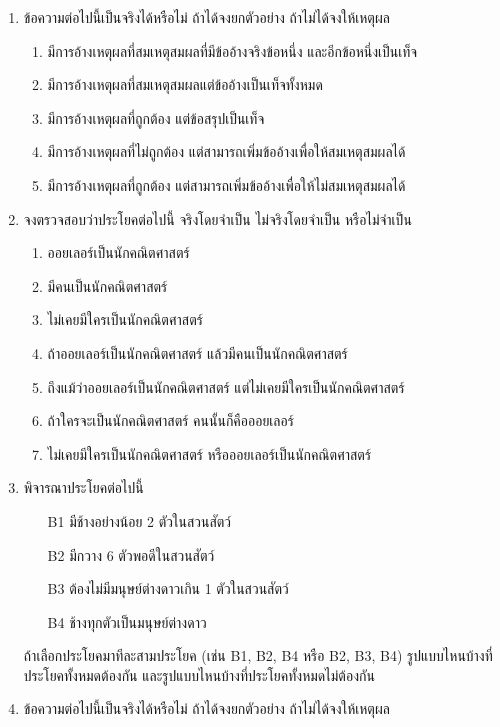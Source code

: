 \documentclass[a4paper,12pt]{extbook}
\theoremstyle{definition}
\theoremstyle{remark}
\begin{document}
\begin{enumerate}
\begin{enumerate}[label={(\arabic*)}]
\begin{enumerate}[label={\arabic*.}]
					\end{enumerate}
				\end{enumerate}
				\item ข้อความต่อไปนี้เป็นจริงได้หรือไม่ ถ้าได้จงยกตัวอย่าง ถ้าไม่ได้จงให้เหตุผล
				\begin{enumerate}[label={\arabic*.}]
					\item มีการอ้างเหตุผลที่สมเหตุสมผลที่มีข้ออ้างจริงข้อหนึ่ง และอีกข้อหนึ่งเป็นเท็จ
					\item มีการอ้างเหตุผลที่สมเหตุสมผลแต่ข้ออ้างเป็นเท็จทั้งหมด
					\item มีการอ้างเหตุผลที่ถูกต้อง แต่ข้อสรุปเป็นเท็จ
					\item มีการอ้างเหตุผลที่ไม่ถูกต้อง แต่สามารถเพิ่มข้ออ้างเพื่อให้สมเหตุสมผลได้
					\item มีการอ้างเหตุผลที่ถูกต้อง แต่สามารถเพิ่มข้ออ้างเพื่อให้ไม่สมเหตุสมผลได้
				\end{enumerate}
				\item จงตรวจสอบว่าประโยคต่อไปนี้ จริงโดยจำเป็น ไม่จริงโดยจำเป็น หรือไม่จำเป็น
				\begin{enumerate}[label={\arabic*.}]
					\item ออยเลอร์เป็นนักคณิตศาสตร์
					\item มีคนเป็นนักคณิตศาสตร์
					\item ไม่เคยมีใครเป็นนักคณิตศาสตร์
					\item ถ้าออยเลอร์เป็นนักคณิตศาสตร์ แล้วมีคนเป็นนักคณิตศาสตร์
					\item ถึงแม้ว่าออยเลอร์เป็นนักคณิตศาสตร์ แต่ไม่เคยมีใครเป็นนักคณิตศาสตร์
					\item ถ้าใครจะเป็นนักคณิตศาสตร์ คนนั้นก็คือออยเลอร์
					\item ไม่เคยมีใครเป็นนักคณิตศาสตร์ หรือออยเลอร์เป็นนักคณิตศาสตร์
				\end{enumerate}
				\item พิจารณาประโยคต่อไปนี้
				\begin{itemize}
					\item[B1] มีช้างอย่างน้อย 2 ตัวในสวนสัตว์
					\item[B2] มีกวาง 6 ตัวพอดีในสวนสัตว์
					\item[B3] ต้องไม่มีมนุษย์ต่างดาวเกิน 1 ตัวในสวนสัตว์
					\item[B4] ช้างทุกตัวเป็นมนุษย์ต่างดาว
				\end{itemize}
				ถ้าเลือกประโยคมาทีละสามประโยค (เช่น B1, B2, B4 หรือ B2, B3, B4) รูปแบบไหนบ้างที่ประโยคทั้งหมดต้องกัน และรูปแบบไหนบ้างที่ประโยคทั้งหมดไม่ต้องกัน
				\item ข้อความต่อไปนี้เป็นจริงได้หรือไม่ ถ้าได้จงยกตัวอย่าง ถ้าไม่ได้จงให้เหตุผล

\end{enumerate}
\end{document}
